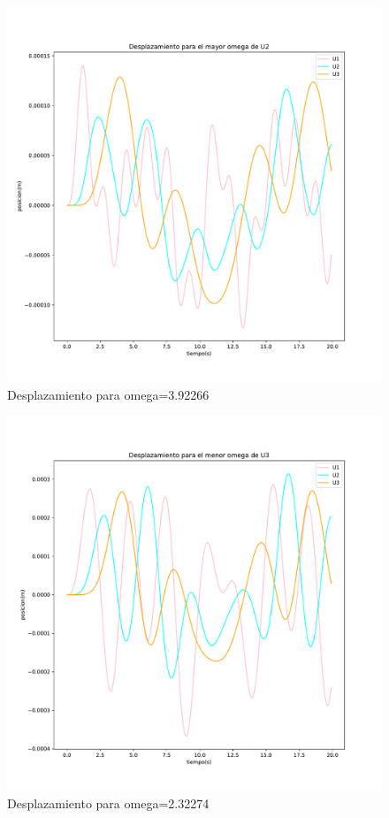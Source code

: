 \documentclass[11pt,letterpaper]{exam}
\begin{document}
\begin{figure}[H]
    \centering
    \includegraphics[width=1.1\textwidth]{plot_omega3.pdf}
    \caption{Desplazamiento para omega=3.92266}
    \label{fig:my_label}
\end{figure}

\begin{figure}[H]
    \centering
    \includegraphics[width=1.1\textwidth]{plot_omega4.pdf}
    \caption{Desplazamiento para omega=2.32274}
    \label{fig:my_label}
\end{figure}
\end{document}
